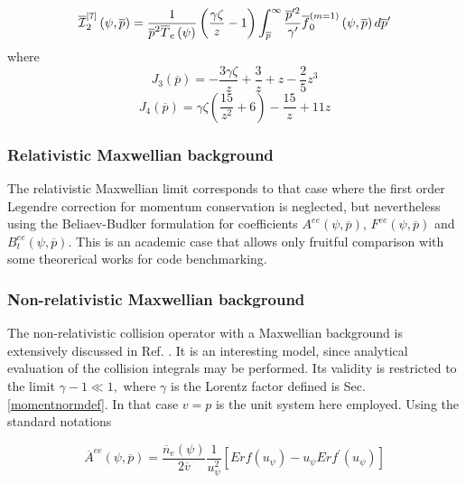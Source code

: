 \begin{equation}
\overline{\mathcal{I}}_{2}^{\left[ 7\right] }\left( \psi ,\overline{p}%
\right) =\frac{1}{\overline{p}^{2}\overline{T}_{e}\left( \psi \right) }%
\left( \frac{\gamma \zeta }{z}-1\right) \int_{\overline{p}}^{\infty }\frac{%
\overline{p}^{\prime 2}}{\gamma ^{\prime }}\overline{f}_{0}^{\left(
m=1\right) }\left( \psi ,\overline{p}\right) d\overline{p}^{\prime }
\end{equation}
where
\begin{equation}
J_{3}\left( \overline{p}\right) =-\frac{3\gamma \zeta }{z}+\frac{3}{z}+z-%
\frac{2}{5}z^{3}
\end{equation}
\begin{equation}
J_{4}\left( \overline{p}\right) =\gamma \zeta \left( \frac{15}{z^{2}}%
+6\right) -\frac{15}{z}+11z
\end{equation}

\subsubsection{Relativistic Maxwellian background}

The relativistic Maxwellian limit corresponds to that case where the first
order Legendre correction for momentum conservation is neglected, but
nevertheless using the Beliaev-Budker formulation for coefficients $%
A^{ee}\left( \psi ,\overline{p}\right) $, $F^{ee}\left( \psi ,\overline{p}%
\right) $ and $B_{t}^{ee}\left( \psi ,\overline{p}\right) .$ This is an
academic case that allows only fruitful comparison with some theorerical
works for code benchmarking.

\subsubsection{Non-relativistic Maxwellian background}

The non-relativistic collision operator with a Maxwellian background is
extensively discussed in Ref. \cite{kar86}. It is an interesting model,
since analytical evaluation of the collision integrals may be performed. Its
validity is restricted to the limit $\gamma -1\ll 1,$ where $\gamma $ is the
Lorentz factor defined is Sec.\ref{momentnormdef}. In that case $v=p$ is the
unit system here employed. Using the standard notations

\begin{equation}
\overline{A}^{ee}\left( \psi ,\overline{p}\right) =\frac{\overline{n}%
_{e}\left( \psi \right) }{2\overline{v}}\frac{1}{u_{\psi }^{2}}\left[
Erf\left( u_{\psi }\right) -u_{\psi }Erf^{\prime }\left( u_{\psi }\right)
\right]
\end{equation}

